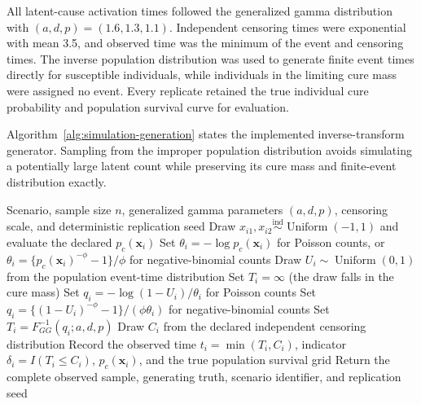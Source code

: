 All latent-cause activation times followed the generalized gamma
distribution with $(a,d,p)=(1.6,1.3,1.1)$. Independent censoring times
were exponential with mean 3.5, and observed time was the minimum of the
event and censoring times. The inverse population distribution was used
to generate finite event times directly for susceptible individuals, while
individuals in the limiting cure mass were assigned no event. Every
replicate retained the true individual cure probability and population
survival curve for evaluation.

Algorithm~\ref{alg:simulation-generation} states the implemented
inverse-transform generator. Sampling from the improper population
distribution avoids simulating a potentially large latent count while
preserving its cure mass and finite-event distribution exactly.
\begin{algorithm*}[tbp]
\caption{Right-censored simulation from a promotion-time population distribution}\label{alg:simulation-generation}
\begin{algorithmic}[1]
\Require Scenario, sample size $n$, generalized gamma parameters $(a,d,p)$, censoring scale, and deterministic replication seed
  \State Draw $x_{i1},x_{i2}\stackrel{\mathrm{ind}}{\sim}\operatorname{Uniform}(-1,1)$ and evaluate the declared $p_c(\bm{x}_i)$
  \State Set $\theta_i=-\log p_c(\bm{x}_i)$ for Poisson counts, or $\theta_i=\{p_c(\bm{x}_i)^{-\phi}-1\}/\phi$ for negative-binomial counts
  \State Draw $U_i\sim\operatorname{Uniform}(0,1)$ from the population event-time distribution
    \State Set $T_i=\infty$ (the draw falls in the cure mass)
  \Else
    \State Set $q_i=-\log(1-U_i)/\theta_i$ for Poisson counts
    \State Set $q_i=\{(1-U_i)^{-\phi}-1\}/(\phi\theta_i)$ for negative-binomial counts
    \State Set $T_i=F_{GG}^{-1}(q_i;a,d,p)$
  \EndIf
  \State Draw $C_i$ from the declared independent censoring distribution
  \State Record the observed time $t_i=\min(T_i,C_i)$, indicator $\delta_i=I(T_i\leq C_i)$, $p_c(\bm{x}_i)$, and the true population survival grid
\EndFor
\State Return the complete observed sample, generating truth, scenario identifier, and replication seed
\end{algorithmic}
\end{algorithm*}

